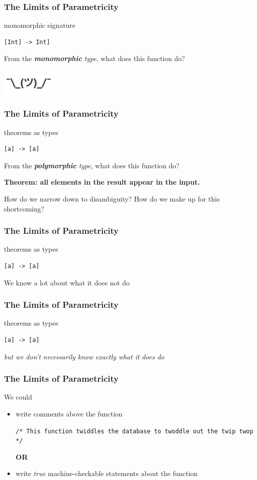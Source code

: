 \begin{frame}[fragile]
\frametitle{The Limits of Parametricity}
\begin{block}{monomorphic signature}
\begin{lstlisting}[style=csharp]
[Int] -> Int]
\end{lstlisting}
From the \emph{\textbf{monomorphic} type}, what does this function do?
\end{block}
\includegraphics[width=0.2\textwidth]{image/shrug.png}
\end{frame}

\begin{frame}[fragile]
\frametitle{The Limits of Parametricity}
\begin{block}{theorems as types}
\begin{lstlisting}[style=csharp]
[a] -> [a]
\end{lstlisting}
From the \emph{\textbf{polymorphic} type}, what does this function do?
\end{block}
\large{\textbf{Theorem: all elements in the result appear in the input.}}

\tiny{How do we narrow down to disambiguity? How do we make up for this shortcoming?}
\end{frame}

\begin{frame}[fragile]
\frametitle{The Limits of Parametricity}
\begin{block}{theorems as types}
\begin{lstlisting}[style=csharp]
[a] -> [a]
\end{lstlisting}
\end{block}
We know a lot about what it does not do
\end{frame}

\begin{frame}[fragile]
\frametitle{The Limits of Parametricity}
\begin{block}{theorems as types}
\begin{lstlisting}[style=csharp]
[a] -> [a]
\end{lstlisting}
\end{block}
\emph{but we don't necessarily know exactly what it does do}
\end{frame}

\begin{frame}[fragile]
\frametitle{The Limits of Parametricity}
\begin{block}{We could}
\begin{itemize}
  \item<1-> write comments above the function

            \lstinline[style=csharp]{/* This function twiddles the database to twoddle out the twip twop */}

            \textbf{OR}
  \item<2-> write \emph{true} machine-checkable statements about the function
\end{itemize}
\end{block}
\end{frame}

